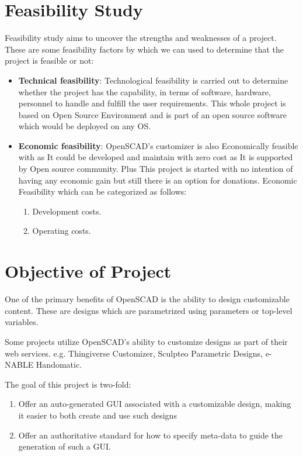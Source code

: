 \documentclass[12pt]{report}
\begin{document}
\section{Feasibility Study}
Feasibility study aims to uncover the strengths and weaknesses of
a project. These are some feasibility factors by which we can used to determine that the project is feasible or not:
\begin{itemize}
	\item {\bf{Technical feasibility}}: Technological feasibility is carried
	out to determine whether the project has the capability, in terms of
	software, hardware, personnel to handle and fulfill the user requirements. This whole project is based on Open
	Source Environment and is part of an open source software which would be deployed on any OS.
	
	\item {\bf{Economic feasibility}}: OpenSCAD's customizer is also Economically feasible with as It could be developed and maintain with zero cost as It is supported by Open source community.
	Plus This project is started with no intention of having any economic gain but still there is an option for donations. Economic Feasibility which can be categorized
	as follows:
	\begin{enumerate}
		\item Development costs.
		\item Operating costs.
	\end{enumerate}

	
\end{itemize}

\section{Objective of Project}

One of the primary benefits of OpenSCAD is the ability to design customizable content. These are designs which are parametrized using parameters or top-level variables.

Some projects utilize OpenSCAD's ability to customize designs as part of their web services.
e.g. Thingiverse Customizer, Sculpteo Parametric Designs, e-NABLE Handomatic.

The goal of this project is two-fold:
\begin{enumerate}
	\item  Offer an auto-generated GUI associated with a customizable design, making it easier to both create and use such designs
	\item Offer an authoritative standard for how to specify meta-data to guide the generation of such a GUI.
	
\end{enumerate}
\end{document}
